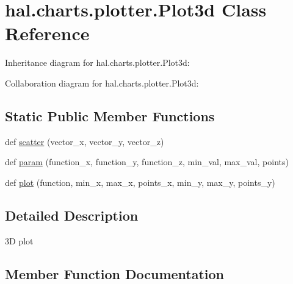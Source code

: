 \hypertarget{classhal_1_1charts_1_1plotter_1_1_plot3d}{}\section{hal.\+charts.\+plotter.\+Plot3d Class Reference}
\label{classhal_1_1charts_1_1plotter_1_1_plot3d}


Inheritance diagram for hal.\+charts.\+plotter.\+Plot3d\+:


Collaboration diagram for hal.\+charts.\+plotter.\+Plot3d\+:
\subsection*{Static Public Member Functions}
\begin{DoxyCompactItemize}
\item 
def \hyperlink{classhal_1_1charts_1_1plotter_1_1_plot3d_a1f446f8ff8f577def935bb452bd42619}{scatter} (vector\+\_\+x, vector\+\_\+y, vector\+\_\+z)
\item 
def \hyperlink{classhal_1_1charts_1_1plotter_1_1_plot3d_ab90291c736da933b3966c36f755e6ee7}{param} (function\+\_\+x, function\+\_\+y, function\+\_\+z, min\+\_\+val, max\+\_\+val, points)
\item 
def \hyperlink{classhal_1_1charts_1_1plotter_1_1_plot3d_a21a7b721bb7e21b150a3141efd5e50cf}{plot} (function, min\+\_\+x, max\+\_\+x, points\+\_\+x, min\+\_\+y, max\+\_\+y, points\+\_\+y)
\end{DoxyCompactItemize}


\subsection{Detailed Description}
\begin{DoxyVerb}3D plot \end{DoxyVerb}
 

\subsection{Member Function Documentation}
